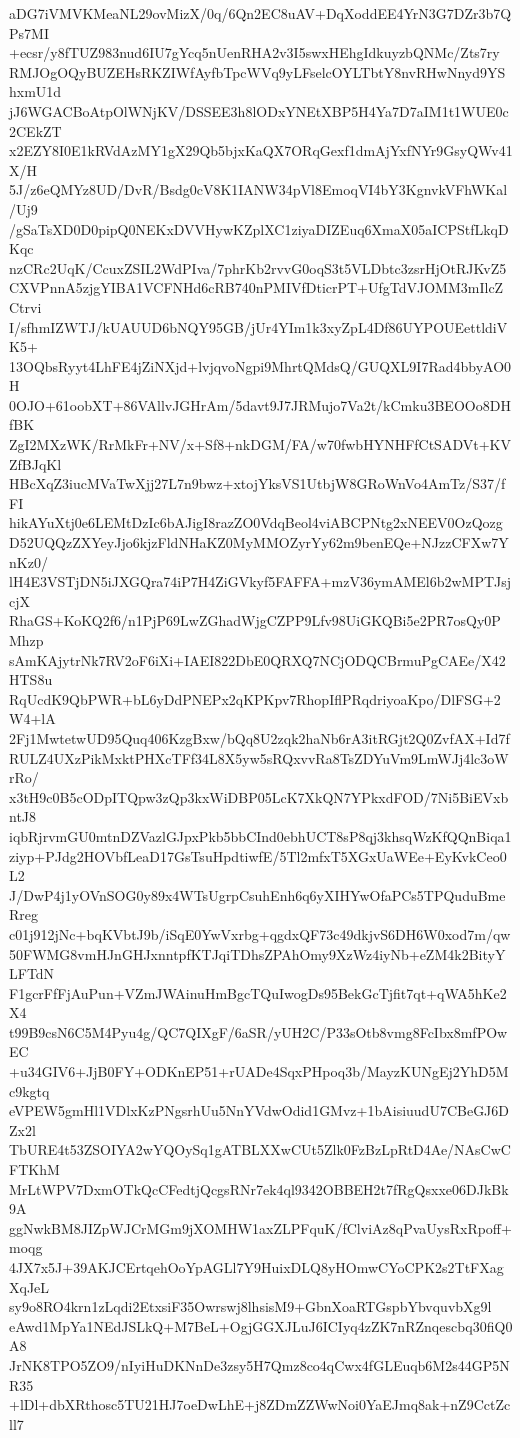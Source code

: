 aDG7iVMVKMeaNL29ovMizX/0q/6Qn2EC8uAV+DqXoddEE4YrN3G7DZr3b7QPs7MI
+ecsr/y8fTUZ983nud6IU7gYcq5nUenRHA2v3I5swxHEhgIdkuyzbQNMc/Zts7ry
RMJOgOQyBUZEHsRKZIWfAyfbTpcWVq9yLFselcOYLTbtY8nvRHwNnyd9YShxmU1d
jJ6WGACBoAtpOlWNjKV/DSSEE3h8lODxYNEtXBP5H4Ya7D7aIM1t1WUE0c2CEkZT
x2EZY8I0E1kRVdAzMY1gX29Qb5bjxKaQX7ORqGexf1dmAjYxfNYr9GsyQWv41X/H
5J/z6eQMYz8UD/DvR/Bsdg0cV8K1IANW34pVl8EmoqVI4bY3KgnvkVFhWKal/Uj9
/gSaTsXD0D0pipQ0NEKxDVVHywKZplXC1ziyaDIZEuq6XmaX05aICPStfLkqDKqc
nzCRc2UqK/CcuxZSIL2WdPIva/7phrKb2rvvG0oqS3t5VLDbtc3zsrHjOtRJKvZ5
CXVPnnA5zjgYIBA1VCFNHd6cRB740nPMIVfDticrPT+UfgTdVJOMM3mIlcZCtrvi
I/sfhmIZWTJ/kUAUUD6bNQY95GB/jUr4YIm1k3xyZpL4Df86UYPOUEettldiVK5+
13OQbsRyyt4LhFE4jZiNXjd+lvjqvoNgpi9MhrtQMdsQ/GUQXL9I7Rad4bbyAO0H
0OJO+61oobXT+86VAllvJGHrAm/5davt9J7JRMujo7Va2t/kCmku3BEOOo8DHfBK
ZgI2MXzWK/RrMkFr+NV/x+Sf8+nkDGM/FA/w70fwbHYNHFfCtSADVt+KVZfBJqKl
HBcXqZ3iucMVaTwXjj27L7n9bwz+xtojYksVS1UtbjW8GRoWnVo4AmTz/S37/fFI
hikAYuXtj0e6LEMtDzIc6bAJigI8razZO0VdqBeol4viABCPNtg2xNEEV0OzQozg
D52UQQzZXYeyJjo6kjzFldNHaKZ0MyMMOZyrYy62m9benEQe+NJzzCFXw7YnKz0/
lH4E3VSTjDN5iJXGQra74iP7H4ZiGVkyf5FAFFA+mzV36ymAMEl6b2wMPTJsjcjX
RhaGS+KoKQ2f6/n1PjP69LwZGhadWjgCZPP9Lfv98UiGKQBi5e2PR7osQy0PMhzp
sAmKAjytrNk7RV2oF6iXi+IAEI822DbE0QRXQ7NCjODQCBrmuPgCAEe/X42HTS8u
RqUcdK9QbPWR+bL6yDdPNEPx2qKPKpv7RhopIflPRqdriyoaKpo/DlFSG+2W4+lA
2Fj1MwtetwUD95Quq406KzgBxw/bQq8U2zqk2haNb6rA3itRGjt2Q0ZvfAX+Id7f
RULZ4UXzPikMxktPHXcTFf34L8X5yw5sRQxvvRa8TsZDYuVm9LmWJj4lc3oWrRo/
x3tH9c0B5cODpITQpw3zQp3kxWiDBP05LcK7XkQN7YPkxdFOD/7Ni5BiEVxbntJ8
iqbRjrvmGU0mtnDZVazlGJpxPkb5bbCInd0ebhUCT8sP8qj3khsqWzKfQQnBiqa1
ziyp+PJdg2HOVbfLeaD17GsTsuHpdtiwfE/5Tl2mfxT5XGxUaWEe+EyKvkCeo0L2
J/DwP4j1yOVnSOG0y89x4WTsUgrpCsuhEnh6q6yXIHYwOfaPCs5TPQuduBmeRreg
c01j912jNc+bqKVbtJ9b/iSqE0YwVxrbg+qgdxQF73c49dkjvS6DH6W0xod7m/qw
50FWMG8vmHJnGHJxnntpfKTJqiTDhsZPAhOmy9XzWz4iyNb+eZM4k2BityYLFTdN
F1gcrFfFjAuPun+VZmJWAinuHmBgcTQuIwogDs95BekGcTjfit7qt+qWA5hKe2X4
t99B9csN6C5M4Pyu4g/QC7QIXgF/6aSR/yUH2C/P33sOtb8vmg8FcIbx8mfPOwEC
+u34GIV6+JjB0FY+ODKnEP51+rUADe4SqxPHpoq3b/MayzKUNgEj2YhD5Mc9kgtq
eVPEW5gmHl1VDlxKzPNgsrhUu5NnYVdwOdid1GMvz+1bAisiuudU7CBeGJ6DZx2l
TbURE4t53ZSOIYA2wYQOySq1gATBLXXwCUt5Zlk0FzBzLpRtD4Ae/NAsCwCFTKhM
MrLtWPV7DxmOTkQcCFedtjQcgsRNr7ek4ql9342OBBEH2t7fRgQsxxe06DJkBk9A
ggNwkBM8JIZpWJCrMGm9jXOMHW1axZLPFquK/fClviAz8qPvaUysRxRpoff+moqg
4JX7x5J+39AKJCErtqehOoYpAGLl7Y9HuixDLQ8yHOmwCYoCPK2s2TtFXagXqJeL
sy9o8RO4krn1zLqdi2EtxsiF35Owrswj8lhsisM9+GbnXoaRTGspbYbvquvbXg9l
eAwd1MpYa1NEdJSLkQ+M7BeL+OgjGGXJLuJ6ICIyq4zZK7nRZnqescbq30fiQ0A8
JrNK8TPO5ZO9/nIyiHuDKNnDe3zsy5H7Qmz8co4qCwx4fGLEuqb6M2s44GP5NR35
+lDl+dbXRthosc5TU21HJ7oeDwLhE+j8ZDmZZWwNoi0YaEJmq8ak+nZ9CctZcll7
